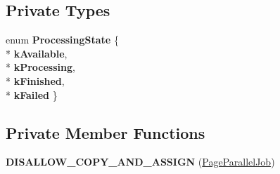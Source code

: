 \subsection*{Private Types}
\begin{DoxyCompactItemize}
\item 
enum {\bfseries Processing\+State} \{ \\*
{\bfseries k\+Available}, 
\\*
{\bfseries k\+Processing}, 
\\*
{\bfseries k\+Finished}, 
\\*
{\bfseries k\+Failed}
 \}\hypertarget{classv8_1_1internal_1_1_page_parallel_job_a9bc8059f7ce79dde6534f2e34eb11764}{}\label{classv8_1_1internal_1_1_page_parallel_job_a9bc8059f7ce79dde6534f2e34eb11764}

\end{DoxyCompactItemize}
\subsection*{Private Member Functions}
\begin{DoxyCompactItemize}
\item 
{\bfseries D\+I\+S\+A\+L\+L\+O\+W\+\_\+\+C\+O\+P\+Y\+\_\+\+A\+N\+D\+\_\+\+A\+S\+S\+I\+GN} (\hyperlink{classv8_1_1internal_1_1_page_parallel_job}{Page\+Parallel\+Job})\hypertarget{classv8_1_1internal_1_1_page_parallel_job_a28c94c84f4b11203f3fc5396187d3721}{}\label{classv8_1_1internal_1_1_page_parallel_job_a28c94c84f4b11203f3fc5396187d3721}

\end{DoxyCompactItemize}
